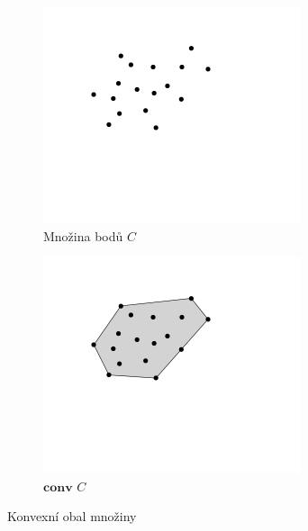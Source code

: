 \begin{figure}[h!]
    \centering
    \begin{subfigure}[b]{0.3\textwidth}
        \centering
        \includegraphics[width=\textwidth]{img/points.png}
        \caption{Množina bodů $C$}
        \label{fig:convex_hull:a}
    \end{subfigure}

    \hfill

    \begin{subfigure}[b]{0.3\textwidth}
        \centering
        \includegraphics[width=\textwidth]{img/convex_hull.png}
        \caption{$\textbf{conv }C$}
        \label{fig:convex_hull:b}
    \end{subfigure}
     
    \caption{Konvexní obal množiny}
    \label{fig:convex_hull}
\end{figure}


